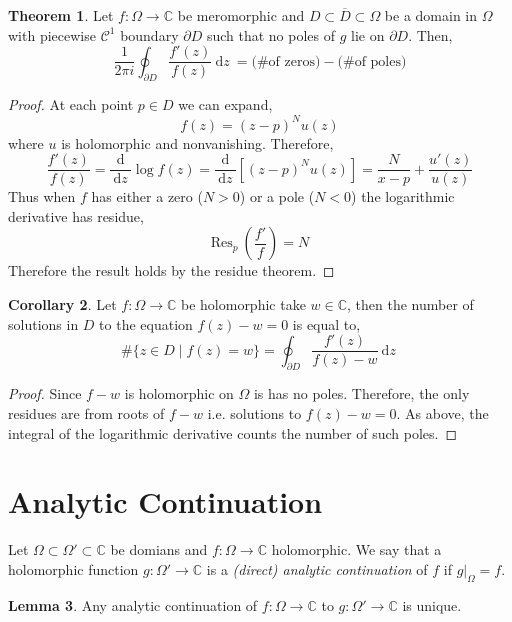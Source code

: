 \documentclass[12pt]{extarticle}
\newcommand{\C}{\mathbb{C}}
\renewcommand{\d}[1]{\: \mathrm{d}#1 \:}
\newcommand{\deriv}[2]{\frac{\d{#1}}{\d{#2}}}
\theoremstyle{definition}
\newtheorem{theorem}{Theorem}[section]
\newtheorem{lemma}[theorem]{Lemma}
\newtheorem{corollary}[theorem]{Corollary}
\newenvironment{definition}[1][Definition:]{\begin{trivlist}
\item[\hskip \labelsep {\bfseries #1}]}{\end{trivlist}}
\newcommand{\Res}[2]{\mathrm{Res}_{#1} \: #2}
\begin{document}
\begin{theorem}
Let $f : \Omega \to \C$ be meromorphic and $D \subset \overline{D} \subset \Omega$ be a domain in $\Omega$ with piecewise $\mathcal{C}^1$ boundary $\partial D$ such that no poles of $g$ lie on $\partial D$. Then,
\[ 
\frac{1}{2 \pi i} \oint_{\partial D} \frac{f'(z)}{f(z)} \d{z} = \text{(\# of zeros)} - \text{(\# of poles)}
\]
\end{theorem}

\begin{proof}
At each point $p \in D$ we can expand,
\[ f(z) = (z - p)^N u(z) \]
where $u$ is holomorphic and nonvanishing. Therefore,
\[ \frac{f'(z)}{f(z)} = \deriv{}{z} \log{f(z)} = \deriv{}{z} \left[ (z - p)^N u(z) \right] = \frac{N}{x - p} + \frac{u'(z)}{u(z)} \]
Thus when $f$ has either a zero ($N > 0$) or a pole ($N < 0$) the logarithmic derivative has residue,
\[ \Res{p}{\left(\frac{f'}{f}\right)} = N \]
Therefore the result holds by the residue theorem. 
\end{proof}

\begin{corollary}
Let $f : \Omega \to \C$ be holomorphic take $w \in \C$, then the number of solutions in $D$ to the equation $f(z) - w = 0$ is equal to,
\[ \#\{ z \in D \mid f(z) = w \} = \oint_{\partial D} \frac{f'(z)}{f(z) - w} \d{z}  \]
\end{corollary}

\begin{proof}
Since $f - w$ is holomorphic on $\Omega$ is has no poles. Therefore, the only residues are from roots of $f - w$ i.e. solutions to $f(z) - w = 0$. As above, the integral of the logarithmic derivative counts the number of such poles.  
\end{proof}


\section{Analytic Continuation}

\begin{definition}
Let $\Omega \subset \Omega' \subset \C$ be domians and $f : \Omega \to \C$ holomorphic. We say that a holomorphic function $g : \Omega' \to \C$ is a \textit{(direct) analytic continuation} of $f$ if $g|_\Omega = f$. 
\end{definition}

\begin{lemma}
Any analytic continuation of $f : \Omega \to \C$ to $g : \Omega' \to \C$ is unique.
\end{lemma}
\end{document}
